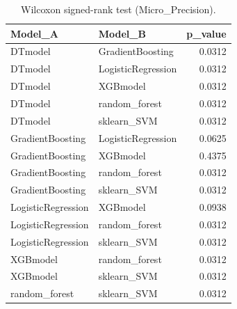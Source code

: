 \begin{table}[t]
\centering
\begin{tabular}{llr}
\toprule
Model_A & Model_B & p_value \\
\midrule
DTmodel & GradientBoosting & 0.0312 \\
DTmodel & LogisticRegression & 0.0312 \\
DTmodel & XGBmodel & 0.0312 \\
DTmodel & random_forest & 0.0312 \\
DTmodel & sklearn_SVM & 0.0312 \\
GradientBoosting & LogisticRegression & 0.0625 \\
GradientBoosting & XGBmodel & 0.4375 \\
GradientBoosting & random_forest & 0.0312 \\
GradientBoosting & sklearn_SVM & 0.0312 \\
LogisticRegression & XGBmodel & 0.0938 \\
LogisticRegression & random_forest & 0.0312 \\
LogisticRegression & sklearn_SVM & 0.0312 \\
XGBmodel & random_forest & 0.0312 \\
XGBmodel & sklearn_SVM & 0.0312 \\
random_forest & sklearn_SVM & 0.0312 \\
\bottomrule
\end{tabular}
\caption{Wilcoxon signed-rank test (Micro_Precision).}
\label{tab:wilcoxon_Micro_Precision}
\end{table}